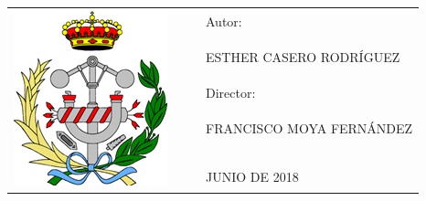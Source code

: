 \begin{tabular}{cccl}
 \multirow{11}{*}{\includegraphics[scale=0.75]{portada/toledo.jpg}}
 &  & & Autor:\\
 &  &  & \\
 &  &  & ESTHER CASERO RODRÍGUEZ \\
 &  &  & \\
 &  &  & Director: \\
 &  &  & \\
 &  &  & FRANCISCO MOYA FERNÁNDEZ \\
 &  &  & \\
 &  &  & \\
 &  &  & \\
 &  &  & JUNIO DE 2018
\end{tabular}

\newpage
$\ $
\thispagestyle{empty}